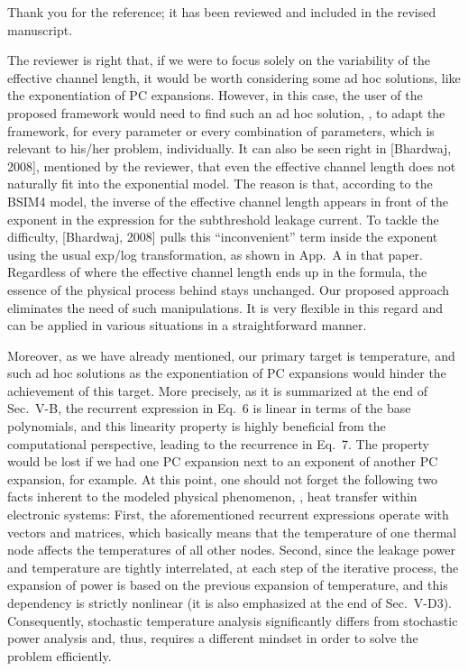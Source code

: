 \begin{authors}
Thank you for the reference; it has been reviewed and included in the revised manuscript.

The reviewer is right that, if we were to focus solely on the variability of the effective channel length, it would be worth considering some ad hoc solutions, like the exponentiation of PC expansions.
However, in this case, the user of the proposed framework would need to find such an ad hoc solution, \ie, to adapt the framework, for every parameter or every combination of parameters, which is relevant to his/her problem, individually.
It can also be seen right in [Bhardwaj, 2008], mentioned by the reviewer, that even the effective channel length does not naturally fit into the exponential model.
The reason is that, according to the BSIM4 model, the inverse of the effective channel length appears in front of the exponent in the expression for the subthreshold leakage current.
To tackle the difficulty, [Bhardwaj, 2008] pulls this ``inconvenient'' term inside the exponent using the usual exp/log transformation, as shown in App.~A in that paper.
Regardless of where the effective channel length ends up in the formula, the essence of the physical process behind stays unchanged.
Our proposed approach eliminates the need of such manipulations.
It is very flexible in this regard and can be applied in various situations in a straightforward manner.

Moreover, as we have already mentioned, our primary target is temperature, and such ad hoc solutions as the exponentiation of PC expansions would hinder the achievement of this target.
More precisely, as it is summarized at the end of Sec.~V-B, the recurrent expression in Eq.~6 is linear in terms of the base polynomials, and this linearity property is highly beneficial from the computational perspective, leading to the recurrence in Eq.~7.
The property would be lost if we had one PC expansion next to an exponent of another PC expansion, for example.
At this point, one should not forget the following two facts inherent to the modeled physical phenomenon, \ie, heat transfer within electronic systems: First, the aforementioned recurrent expressions operate with vectors and matrices, which basically means that the temperature of one thermal node affects the temperatures of all other nodes.
Second, since the leakage power and temperature are tightly interrelated, at each step of the iterative process, the expansion of power is based on the previous expansion of temperature, and this dependency is strictly nonlinear (it is also emphasized at the end of Sec.~V-D3).
Consequently, stochastic temperature analysis significantly differs from stochastic power analysis and, thus, requires a different mindset in order to solve the problem efficiently.


\end{authors}
